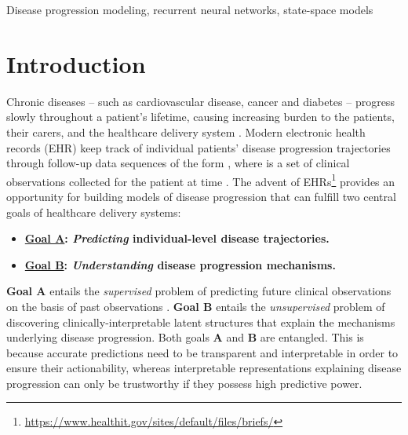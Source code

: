 \documentclass[twoside,11pt]{article}
\begin{document}
\begin{keywords}
Disease progression modeling, recurrent neural networks, state-space models
\end{keywords}

\section{Introduction}
\label{SSec1}
Chronic diseases -- such as cardiovascular disease, cancer and diabetes -- progress slowly throughout a patient's lifetime, causing increasing burden to the patients, their carers, and the healthcare delivery system \cite{sevick2007patients}. Modern electronic health records (EHR) keep track of individual patients' disease progression trajectories through follow-up data sequences of the form \mbox{\footnotesize }, where \mbox{\footnotesize } is a set of clinical observations collected for the patient at time \mbox{\footnotesize }. The advent of EHRs\footnote{\url{https://www.healthit.gov/sites/default/files/briefs/}} provides an opportunity for building models of disease progression that can fulfill two central goals of healthcare delivery systems:
\begin{itemize}
\item \textbf{\underline{Goal A}: \textit{Predicting} individual-level disease trajectories.} 
\item \textbf{\underline{Goal B}: \textit{Understanding} disease progression mechanisms.}   
\end{itemize} 
{\bf Goal A} entails the {\it supervised} problem of predicting future clinical observations \mbox{\footnotesize } on the basis of past observations \mbox{\footnotesize }. {\bf Goal B} entails the {\it unsupervised} problem of discovering clinically-interpretable latent structures that explain the mechanisms underlying disease progression. Both goals {\bf A} and {\bf B} are entangled. This is because accurate predictions need to be transparent and interpretable in order to ensure their actionability, whereas interpretable representations explaining disease progression can only be trustworthy if they possess high predictive power. 
\end{document}
